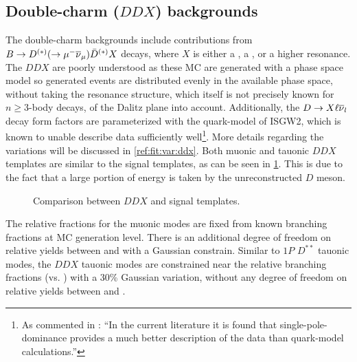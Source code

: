 \subsection{Double-charm ($DDX$) backgrounds}
\label{ref:fit:tmpl:ddx}

The double-charm backgrounds include contributions from
$B \rightarrow D^{(*)}(\rightarrow {\ensuremath{\mu^-}}{\ensuremath{{\overline{\nu}}_\mu}})\bar{D}^{(*)} X$ decays, where $X$
is either a \kaon, a \Kstar, or a higher \Kstar resonance.
The $DDX$ are poorly understood as these MC are generated with
a phase space model so generated events are distributed evenly in the available
phase space, without taking the resonance structure,
which itself is not precisely known for $n \geq 3$-body decays,
of the Dalitz plane into account.
Additionally, the $D \rightarrow X \ell{\ensuremath{{\overline{\nu}}_l}}$ decay form factors are
parameterized with the quark-model of ISGW2,
which is known to unable describe data sufficiently well\footnote{
    As commented in \cite{LHCb-ANA-2020-056}:
    ``In the current literature it is found that single-pole-dominance provides
    a much better description of the data than quark-model calculations.''
}.
More details regarding the variations will be discussed in
\cref{ref:fit:var:ddx}.
Both muonic and tauonic $DDX$ templates are similar to the signal templates,
as can be seen in \cref{fig:ddx-vs-d0-sig}.
This is due to the fact that a large portion of energy is taken by the
unreconstructed $D$ meson.

\begin{figure}[!htb]

    \caption{Comparison between $DDX$ and \Dz\taum signal templates.}
    \label{fig:ddx-vs-d0-sig}
\end{figure}


The relative fractions for the muonic modes are fixed from known branching
fractions at MC generation level.
There is an additional degree of freedom on relative yields between \Bm and \Bzb
with a Gaussian constrain.
Similar to $1P$ $D^{**}$ tauonic modes,
the $DDX$ tauonic modes are constrained near the relative branching fractions
(\tauon vs. \muon) with a 30\% Gaussian variation,
without any degree of freedom on relative yields between \Bm and \Bzb.




